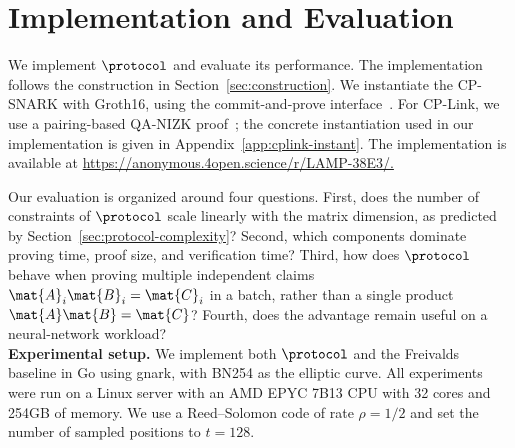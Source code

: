 \section{Implementation and Evaluation}
\label{sec:implementation}

We implement \(\protocol\) and evaluate its performance. The implementation follows the construction in Section~\ref{sec:construction}.  We instantiate the CP-SNARK with Groth16, using the commit-and-prove
interface~\cite{gnark,legosnark}.  For CP-Link, we use a pairing-based QA-NIZK
proof~\cite{qa-nizk}; the concrete instantiation used in our implementation is
given in Appendix~\ref{app:cplink-instant}.  The implementation is available at
\url{https://anonymous.4open.science/r/LAMP-38E3/.}

Our evaluation is organized around four questions.  First, does the number of  constraints of \(\protocol\) scale linearly with the matrix dimension, as predicted by Section~\ref{sec:protocol-complexity}?  Second, which components dominate proving time, proof size, and verification time?  Third, how does \(\protocol\) behave when proving multiple independent claims \(\mat{A}_i\mat{B}_i=\mat{C}_i\) in a batch, rather than a single product \(\mat{A}\mat{B}=\mat{C}\)?  Fourth, does the advantage remain useful on a neural-network workload? \\

\noindent\textbf{Experimental setup.}
We implement both \(\protocol\) and the Freivalds baseline in Go using gnark, with BN254 as the elliptic curve.  All experiments were run on a Linux server with an AMD EPYC 7B13 CPU with 32 cores and 254GB of memory.  We use a Reed--Solomon code of rate \(\rho=1/2\) and set the number of sampled positions to \(t=128\).\




